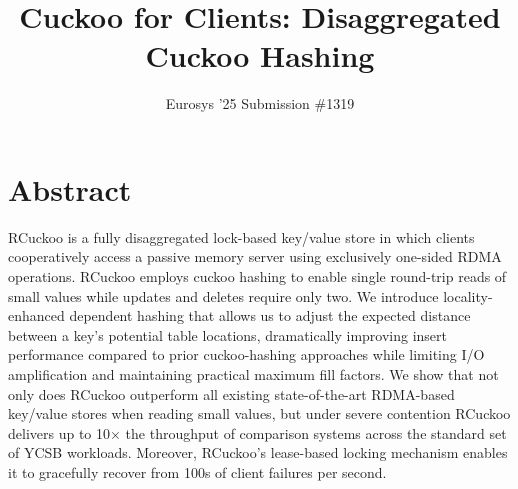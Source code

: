 \documentclass[10pt,twocolumn]{article}
\begin{document}
\title{Cuckoo for Clients: Disaggregated Cuckoo Hashing}
\author{Eurosys '25 Submission \#1319}
\date{}

\maketitle

\section*{Abstract}


RCuckoo is a fully disaggregated lock-based key/value store in which
clients cooperatively access a passive memory server using exclusively
one-sided RDMA operations.  RCuckoo employs cuckoo hashing to enable
single round-trip reads of small values while updates and deletes
require only two.  We introduce locality-enhanced dependent hashing
that allows us to adjust the expected distance between a key's
potential table locations, dramatically improving insert performance
compared to prior cuckoo-hashing approaches while limiting I/O
amplification and maintaining practical maximum fill factors.  We show
that not only does RCuckoo outperform all existing
state-of-the-art RDMA-based key/value stores when reading small values, but under
severe contention RCuckoo delivers up to 10$\times$ the throughput
of comparison systems across the standard set of YCSB workloads.  Moreover,
RCuckoo's lease-based locking mechanism enables it to gracefully
recover from 100s of client failures per second.

\end{document}
